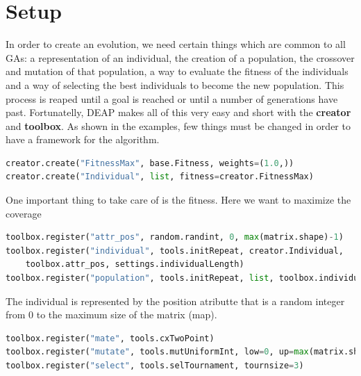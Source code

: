 \documentclass[a4paper,12pt]{report}
\begin{document}
\section {Setup}
In order to create an evolution, we need certain things which are common to all GAs: a representation of an individual, the creation of a population, the crossover and mutation of that population, a way to evaluate the fitness of the individuals and a way of selecting the best individuals to become the new population. This process is reaped until a goal is reached or until a number of generations have past. Fortunatelly, DEAP makes all of this very easy and short with the \textbf{creator} and \textbf{toolbox}. As shown in the examples, few things must be changed in order to have a framework for the algorithm.
\begin{lstlisting}[language=Python]
creator.create("FitnessMax", base.Fitness, weights=(1.0,))
creator.create("Individual", list, fitness=creator.FitnessMax)
\end{lstlisting}

One important thing to take care of is the fitness. Here we want to maximize the coverage

\begin{lstlisting}[language=Python]
toolbox.register("attr_pos", random.randint, 0, max(matrix.shape)-1)
toolbox.register("individual", tools.initRepeat, creator.Individual, 
    toolbox.attr_pos, settings.individualLength)
toolbox.register("population", tools.initRepeat, list, toolbox.individual)
\end{lstlisting}

The individual is represented by the position atributte that is a random integer from 0 to the maximum size of the matrix (map).

\begin{lstlisting}[language=Python]
toolbox.register("mate", tools.cxTwoPoint)
toolbox.register("mutate", tools.mutUniformInt, low=0, up=max(matrix.shape), indpb=0.05)
toolbox.register("select", tools.selTournament, tournsize=3)
\end{lstlisting}
\end{document}
